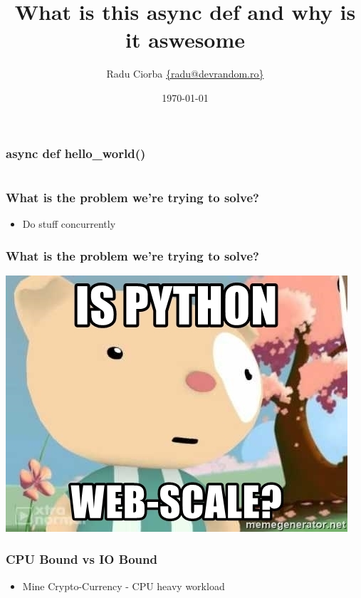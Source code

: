 \documentclass{beamer}
\title[Async Python]{What is this async def and why is it aswesome} %
\author{Radu Ciorba \href{mailto:radu@devrandom.ro}{\{radu@devrandom.ro\}}} %
\date{\today} %
\begin{document}
\begin{frame}
  \titlepage %
\end{frame}

\begin{frame}[fragile]
  \frametitle{async def hello\_world()}
  \inputminted[fontsize=\footnotesize]{python}{code/hw.py}
\end{frame}

\begin{frame}
  \frametitle{What is the problem we're trying to solve?}
  \begin{itemize}
  \item Do stuff concurrently
  \end{itemize}
\end{frame}

\begin{frame}
  \frametitle{What is the problem we're trying to solve?}
  \begin{center}
  \includegraphics[scale=0.70,keepaspectratio=true]{./python-web-scale.jpeg}
  \end{center}
\end{frame}

\begin{frame}
  \frametitle{CPU Bound vs IO Bound}
  \begin{itemize}
  \item Mine Crypto-Currency - CPU heavy workload
  \end{itemize}
\end{frame}
\end{document}
